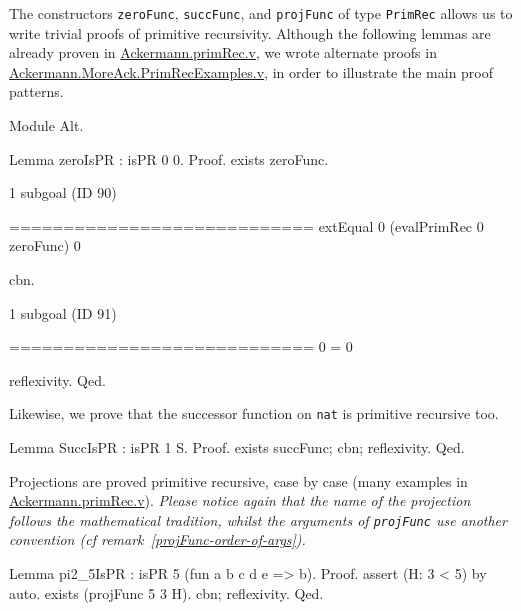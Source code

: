 The constructors \texttt{zeroFunc}, \texttt{succFunc},  and \texttt{projFunc} of type
\texttt{PrimRec} allows us to write trivial proofs of primitive recursivity. 
Although  the following lemmas are already proven in 
\href{../theories/html/hydras.Ackermann.primRec.html}{Ackermann.primRec.v},
we wrote alternate proofs in 
\href{../theories/html/hydras.MoreAck.PrimRecExamples.html}%
{Ackermann.MoreAck.PrimRecExamples.v}, in order to illustrate the main proof patterns.

\begin{Coqsrc}
Module Alt.
  
Lemma zeroIsPR : isPR 0 0.
Proof.
  exists zeroFunc.
\end{Coqsrc}

\begin{Coqanswer}
1 subgoal (ID 90)
  
  ============================
  extEqual 0 (evalPrimRec 0 zeroFunc) 0
\end{Coqanswer}

\begin{Coqsrc}
  cbn.
\end{Coqsrc}


\begin{Coqanswer}
1 subgoal (ID 91)
  
  ============================
  0 = 0
\end{Coqanswer}

\begin{Coqsrc}
  reflexivity.
Qed.
\end{Coqsrc}


Likewise, we prove that the successor function on \texttt{nat} is primitive recursive too.

\begin{Coqsrc}
Lemma SuccIsPR : isPR 1 S.
Proof.
  exists succFunc; cbn; reflexivity.
Qed.
\end{Coqsrc}

Projections are proved primitive recursive, case by case (many examples in 
\href{../theories/html/hydras.primRec.html}{Ackermann.primRec.v}).
\emph{Please notice again that the name of the projection follows the mathematical tradition, 
whilst the arguments of  \texttt{projFunc} use another convention (\emph{cf} remark~\vref{projFunc-order-of-args}).}

\begin{Coqsrc}
Lemma pi2_5IsPR : isPR 5 (fun a b c d e => b).
Proof.
 assert (H: 3 < 5) by auto.
 exists (projFunc 5 3 H).
 cbn; reflexivity.
Qed.
\end{Coqsrc}

